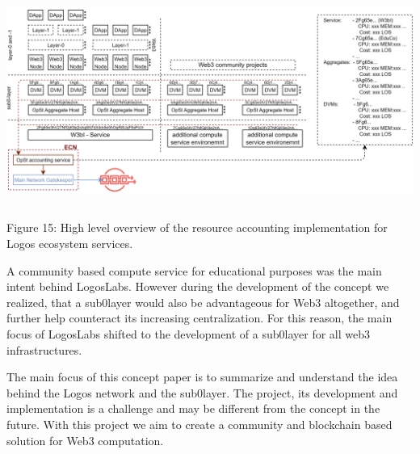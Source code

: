 \documentclass[]{article}
\begin{document}
\begin{center}
	\includegraphics[height=6.9cm]{logos-network-accounting}
\end{center}
\begin{center}
	Figure 15: High level overview of the resource accounting implementation for Logos ecosystem services.
\end{center}

A community based compute service for educational purposes was the main intent behind LogosLabs. 
However during the development of the concept we realized, that a sub0layer would also be advantageous for Web3 altogether, and further help counteract its increasing centralization.
For this reason, the main focus of LogosLabs shifted to the development of a sub0layer for all web3 infrastructures.

The main focus of this concept paper is to summarize and understand the idea behind the Logos network and the sub0layer.
The project, its development and implementation is a challenge and may be different from the concept in the future.
With this project we aim to create a community and blockchain based solution for Web3 computation.

\newpage
\printbibliography %
\newpage

\end{document}
